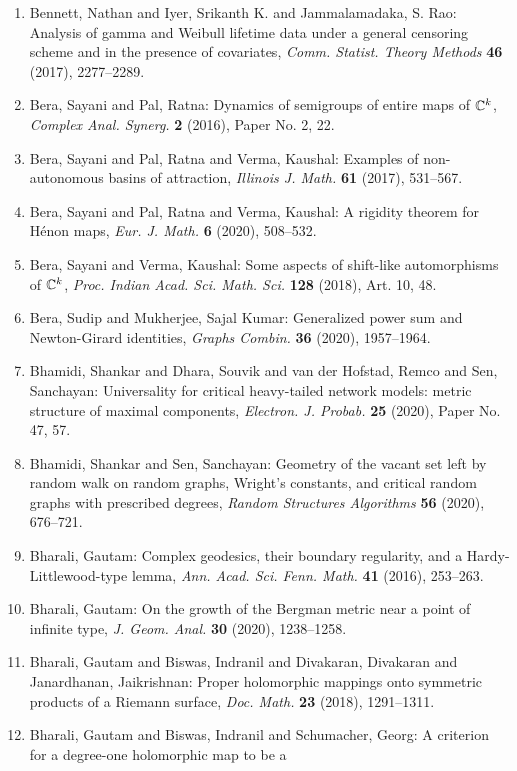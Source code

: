 \begin{enumerate}
\item Bennett, Nathan and Iyer, Srikanth K. and Jammalamadaka, S.
Rao: Analysis of gamma and {W}eibull lifetime data under a general
censoring scheme and in the presence of covariates, \emph{Comm. Statist. Theory Methods} {\bf 46} (2017), 2277--2289.
\item Bera, Sayani and Pal, Ratna: Dynamics of semigroups of entire maps of {$\Bbb{C}^k$}, \emph{Complex Anal. Synerg.} {\bf 2} (2016), Paper No. 2, 22.
\item Bera, Sayani and Pal, Ratna and Verma, Kaushal: Examples of non-autonomous basins of attraction, \emph{Illinois J. Math.} {\bf 61} (2017), 531--567.
\item Bera, Sayani and Pal, Ratna and Verma, Kaushal: A rigidity theorem for {H}\'{e}non maps, \emph{Eur. J. Math.} {\bf 6} (2020), 508--532.
\item Bera, Sayani and Verma, Kaushal: Some aspects of shift-like automorphisms of {$\Bbb C^k$}, \emph{Proc. Indian Acad. Sci. Math. Sci.} {\bf 128} (2018), Art. 10, 48.
\item Bera, Sudip and Mukherjee, Sajal Kumar: Generalized power sum and {N}ewton-{G}irard identities, \emph{Graphs Combin.} {\bf 36} (2020), 1957--1964.
\item Bhamidi, Shankar and Dhara, Souvik and van der Hofstad, Remco
and Sen, Sanchayan: Universality for critical heavy-tailed network models: metric
structure of maximal components, \emph{Electron. J. Probab.} {\bf 25} (2020), Paper No. 47, 57.
\item Bhamidi, Shankar and Sen, Sanchayan: Geometry of the vacant set left by random walk on random
graphs, {W}right's constants, and critical random graphs with
prescribed degrees, \emph{Random Structures Algorithms} {\bf 56} (2020), 676--721.
\item Bharali, Gautam: Complex geodesics, their boundary regularity, and a
{H}ardy-{L}ittlewood-type lemma, \emph{Ann. Acad. Sci. Fenn. Math.} {\bf 41} (2016), 253--263.
\item Bharali, Gautam: On the growth of the {B}ergman metric near a point of infinite
type, \emph{J. Geom. Anal.} {\bf 30} (2020), 1238--1258.
\item Bharali, Gautam and Biswas, Indranil and Divakaran, Divakaran
and Janardhanan, Jaikrishnan: Proper holomorphic mappings onto symmetric products of a
{R}iemann surface, \emph{Doc. Math.} {\bf 23} (2018), 1291--1311.
\item Bharali, Gautam and Biswas, Indranil and Schumacher, Georg: A criterion for a degree-one holomorphic map to be a

\end{enumerate}
